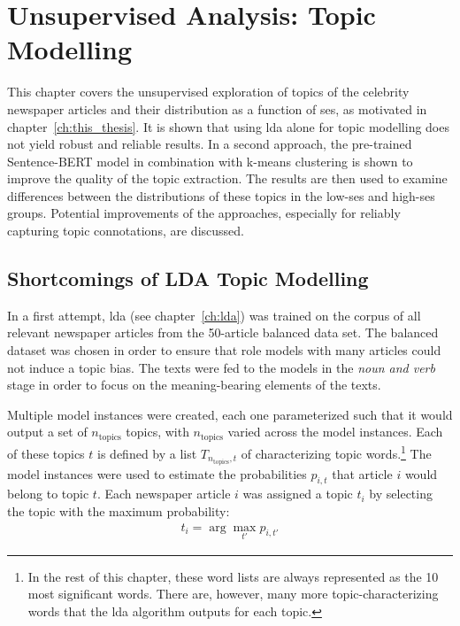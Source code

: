 \renewcommand{\imagepath}{../50-unsupervised/img}
\newcommand{\ntopics}{n_\text{topics}}
\newcommand{\nclusters}{n_\text{clusters}}

\chapter{Unsupervised Analysis: Topic Modelling}\label{ch:unsupervised}
This chapter covers the unsupervised exploration of topics of the celebrity newspaper articles and their distribution as a function of \gls{ses}, as motivated in chapter~\ref{ch:this_thesis}. It is shown that using \gls{lda} alone for topic modelling does not yield robust and reliable results. In a second approach, the pre-trained Sentence-BERT model in combination with k-means clustering is shown to improve the quality of the topic extraction. The results are then used to examine differences between the distributions of these topics in the low-\gls{ses} and high-\gls{ses} groups. Potential improvements of the approaches, especially for reliably capturing topic connotations, are discussed.

\section{Shortcomings of LDA Topic Modelling}\label{ch:lda_topic_modelling}
In a first attempt, \gls{lda} (see chapter~\ref{ch:lda}) was trained on the corpus of all relevant newspaper articles from the 50-article balanced data set. The balanced dataset was chosen in order to ensure that role models with many articles could not induce a topic bias. The texts were fed to the models in the \textit{noun and verb} stage in order to focus on the meaning-bearing elements of the texts.

Multiple model instances were created, each one parameterized such that it would output a set of $\ntopics$ topics, with $\ntopics$ varied across the model instances. Each of these topics $t$ is defined by a list $T_{\ntopics, t}$ of characterizing topic words.\footnote{In the rest of this chapter, these word lists are always represented as the 10 most significant words. There are, however, many more topic-characterizing words that the \gls{lda} algorithm outputs for each topic.} The model instances were used to estimate the probabilities $p_{i, t}$ that article $i$ would belong to topic $t$. Each newspaper article $i$ was assigned a topic $t_i$ by selecting the topic with the maximum probability:
\begin{align}
    t_i = \arg \max_{t'} p_{i, t'}
\end{align}

